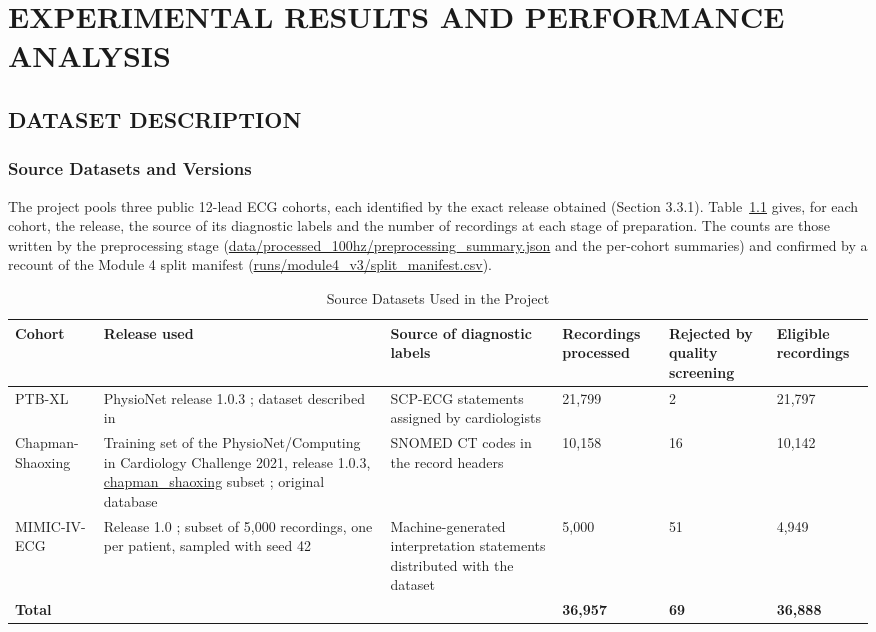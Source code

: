 \chapter{EXPERIMENTAL RESULTS AND PERFORMANCE ANALYSIS}
\label{chap:ch4}





\section{DATASET DESCRIPTION}\label{sec:ch4_1}

\subsection{Source Datasets and Versions}\label{sec:ch4_1_1}

The project pools three public 12-lead ECG cohorts, each identified by the exact release obtained (Section 3.3.1). Table~\ref{tab:ch4_1} gives, for each cohort, the release, the source of its diagnostic labels and the number of recordings at each stage of preparation. The counts are those written by the preprocessing stage (\url{data/processed_100hz/preprocessing_summary.json} and the per-cohort summaries) and confirmed by a recount of the Module 4 split manifest (\url{runs/module4_v3/split_manifest.csv}).

{
\setlength{\tabcolsep}{2pt}
\renewcommand{\arraystretch}{1.12}
\begin{table}[htbp]
\centering
\scriptsize
{}
\caption{Source Datasets Used in the Project}\label{tab:ch4_1}
\begin{tabular}{|p{}|p{}|p{}|p{}|p{}|p{}|}
\hline
\textbf{Cohort} & \textbf{Release used} & \textbf{Source of diagnostic labels} & \textbf{Recordings processed} & \textbf{Rejected by quality screening} & \textbf{Eligible recordings} \\ \hline
PTB-XL & PhysioNet release 1.0.3 \cite{WAGNER2022PTBXLDATA}; dataset described in \cite{WAGNER2020PTBXL} & SCP-ECG statements assigned by cardiologists \cite{WAGNER2020PTBXL} & 21,799 & 2 & 21,797 \\ \hline
Chapman-Shaoxing & Training set of the PhysioNet/Computing in Cardiology Challenge 2021, release 1.0.3, \url{chapman_shaoxing} subset \cite{CINC2021DATA}; original database \cite{ZHENG2020CHAPMAN} & SNOMED CT codes in the record headers & 10,158 & 16 & 10,142 \\ \hline
MIMIC-IV-ECG & Release 1.0 \cite{GOW2023MIMICIVECG}; subset of 5,000 recordings, one per patient, sampled with seed 42 & Machine-generated interpretation statements distributed with the dataset & 5,000 & 51 & 4,949 \\ \hline
\textbf{Total} &  &  & \textbf{36,957} & \textbf{69} & \textbf{36,888} \\ \hline
\end{tabular}
\end{table}
}

